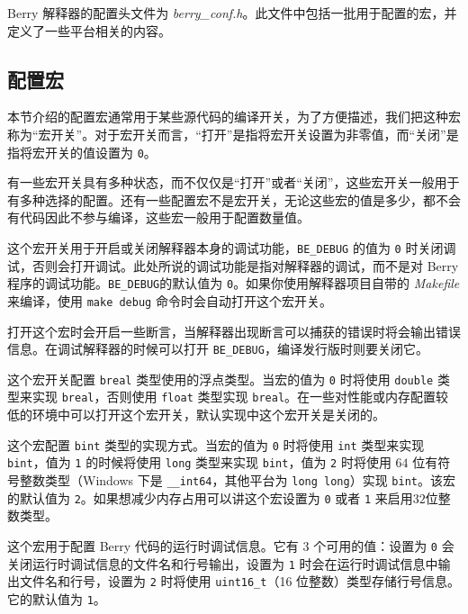 Berry 解释器的配置头文件为 \textsl{berry\_conf.h}。此文件中包括一批用于配置的宏，并定义了一些平台相关的内容。

\subsection{配置宏}

本节介绍的配置宏通常用于某些源代码的编译开关，为了方便描述，我们把这种宏称为``宏开关''。对于宏开关而言，``打开''是指将宏开关设置为非零值，而``关闭''是指将宏开关的值设置为 \texttt{0}。

有一些宏开关具有多种状态，而不仅仅是``打开''或者``关闭''，这些宏开关一般用于有多种选择的配置。还有一些配置宏不是宏开关，无论这些宏的值是多少，都不会有代码因此不参与编译，这些宏一般用于配置数量值。

 \label{section::BE_DEBUG}

这个宏开关用于开启或关闭解释器本身的调试功能，\texttt{BE\_DEBUG} 的值为 \texttt{0} 时关闭调试，否则会打开调试。此处所说的调试功能是指对解释器的调试，而不是对 Berry 程序的调试功能。\texttt{BE\_DEBUG}的默认值为 \texttt{0}。如果你使用解释器项目自带的 \textsl{Makefile} 来编译，使用 \texttt{make debug} 命令时会自动打开这个宏开关。

打开这个宏时会开启一些断言，当解释器出现断言可以捕获的错误时将会输出错误信息。在调试解释器的时候可以打开 \texttt{BE\_DEBUG}，编译发行版时则要关闭它。


这个宏开关配置 \texttt{breal} 类型使用的浮点类型。当宏的值为 \texttt{0} 时将使用 \texttt{double} 类型来实现 \texttt{breal}，否则使用 \texttt{float} 类型实现 \texttt{breal}。在一些对性能或内存配置较低的环境中可以打开这个宏开关，默认实现中这个宏开关是关闭的。


这个宏配置 \texttt{bint} 类型的实现方式。当宏的值为 \texttt{0} 时将使用 \texttt{int} 类型来实现 \texttt{bint}，值为 \texttt{1} 的时候将使用 \texttt{long} 类型来实现 \texttt{bint}，值为 \texttt{2} 时将使用 $64$ 位有符号整数类型（Windows 下是 \texttt{\_\_int64}，其他平台为 \texttt{long long}）实现 \texttt{bint}。该宏的默认值为 \texttt{2}。如果想减少内存占用可以讲这个宏设置为 \texttt{0} 或者 \texttt{1} 来启用$32$位整数类型。


这个宏用于配置 Berry 代码的运行时调试信息。它有 3 个可用的值：设置为 \texttt{0} 会关闭运行时调试信息的文件名和行号输出，设置为 \texttt{1} 时会在运行时调试信息中输出文件名和行号，设置为 \texttt{2} 时将使用 \texttt{uint16\_t}（16 位整数）类型存储行号信息。它的默认值为 \texttt{1}。

